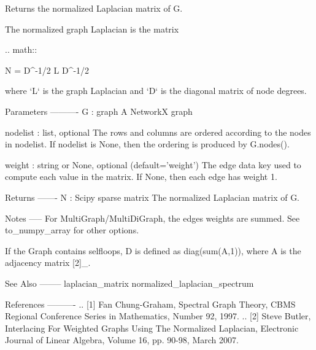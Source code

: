 \begin{DoxyVerb}Returns the normalized Laplacian matrix of G.

The normalized graph Laplacian is the matrix

.. math::

    N = D^{-1/2} L D^{-1/2}

where `L` is the graph Laplacian and `D` is the diagonal matrix of
node degrees.

Parameters
----------
G : graph
   A NetworkX graph

nodelist : list, optional
   The rows and columns are ordered according to the nodes in nodelist.
   If nodelist is None, then the ordering is produced by G.nodes().

weight : string or None, optional (default='weight')
   The edge data key used to compute each value in the matrix.
   If None, then each edge has weight 1.

Returns
-------
N : Scipy sparse matrix
  The normalized Laplacian matrix of G.

Notes
-----
For MultiGraph/MultiDiGraph, the edges weights are summed.
See to_numpy_array for other options.

If the Graph contains selfloops, D is defined as diag(sum(A,1)), where A is
the adjacency matrix [2]_.

See Also
--------
laplacian_matrix
normalized_laplacian_spectrum

References
----------
.. [1] Fan Chung-Graham, Spectral Graph Theory,
   CBMS Regional Conference Series in Mathematics, Number 92, 1997.
.. [2] Steve Butler, Interlacing For Weighted Graphs Using The Normalized
   Laplacian, Electronic Journal of Linear Algebra, Volume 16, pp. 90-98,
   March 2007.
\end{DoxyVerb}
 